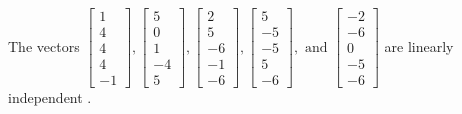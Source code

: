 \begin{exercise}
\begin{exerciseStatement}
  \end{exerciseStatement}
  \begin{exerciseAnswer}
   The vectors \(\left[\begin{array}{r}
1 \\
4 \\
4 \\
4 \\
-1
\end{array}\right] , \left[\begin{array}{r}
5 \\
0 \\
1 \\
-4 \\
5
\end{array}\right] , \left[\begin{array}{r}
2 \\
5 \\
-6 \\
-1 \\
-6
\end{array}\right] , \left[\begin{array}{r}
5 \\
-5 \\
-5 \\
5 \\
-6
\end{array}\right] , \text{ and } \left[\begin{array}{r}
-2 \\
-6 \\
0 \\
-5 \\
-6
\end{array}\right]\) are 
  	 linearly independent  .
  


  \end{exerciseAnswer}
\end{exercise}
